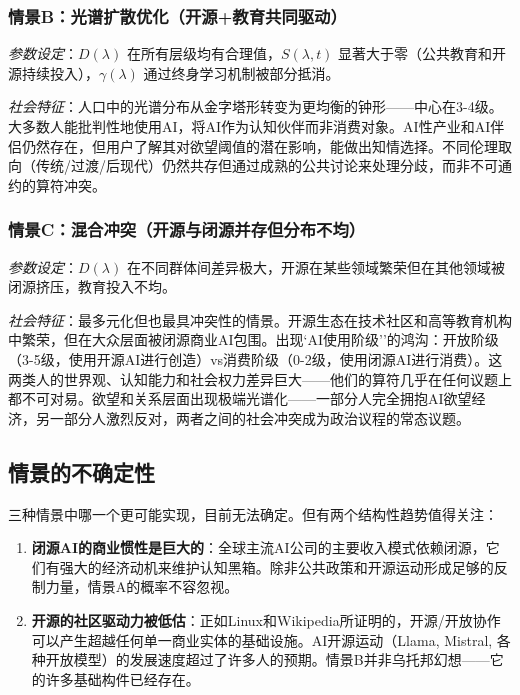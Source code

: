 \documentclass[12pt,a4paper]{ctexart}
\begin{document}
\subsubsection{情景B：光谱扩散优化（开源+教育共同驱动）}

\textit{参数设定}：$D(\lambda)$ 在所有层级均有合理值，$S(\lambda, t)$ 显著大于零（公共教育和开源持续投入），$\gamma(\lambda)$ 通过终身学习机制被部分抵消。

\textit{社会特征}：人口中的光谱分布从金字塔形转变为更均衡的钟形——中心在3-4级。大多数人能批判性地使用AI，将AI作为认知伙伴而非消费对象。AI性产业和AI伴侣仍然存在，但用户了解其对欲望阈值的潜在影响，能做出知情选择。不同伦理取向（传统/过渡/后现代）仍然共存但通过成熟的公共讨论来处理分歧，而非不可通约的算符冲突。

\subsubsection{情景C：混合冲突（开源与闭源并存但分布不均）}

\textit{参数设定}：$D(\lambda)$ 在不同群体间差异极大，开源在某些领域繁荣但在其他领域被闭源挤压，教育投入不均。

\textit{社会特征}：最多元化但也最具冲突性的情景。开源生态在技术社区和高等教育机构中繁荣，但在大众层面被闭源商业AI包围。出现`AI使用阶级''的鸿沟：开放阶级（3-5级，使用开源AI进行创造）vs消费阶级（0-2级，使用闭源AI进行消费）。这两类人的世界观、认知能力和社会权力差异巨大——他们的算符几乎在任何议题上都不可对易。欲望和关系层面出现极端光谱化——一部分人完全拥抱AI欲望经济，另一部分人激烈反对，两者之间的社会冲突成为政治议程的常态议题。

\subsection{情景的不确定性}

三种情景中哪一个更可能实现，目前无法确定。但有两个结构性趋势值得关注：

\begin{enumerate}[label=(\arabic*)]
\item \textbf{闭源AI的商业惯性是巨大的}：全球主流AI公司的主要收入模式依赖闭源，它们有强大的经济动机来维护认知黑箱。除非公共政策和开源运动形成足够的反制力量，情景A的概率不容忽视。
\item \textbf{开源的社区驱动力被低估}：正如Linux和Wikipedia所证明的，开源/开放协作可以产生超越任何单一商业实体的基础设施。AI开源运动（Llama, Mistral, 各种开放模型）的发展速度超过了许多人的预期。情景B并非乌托邦幻想——它的许多基础构件已经存在。
\end{enumerate}
\end{document}
